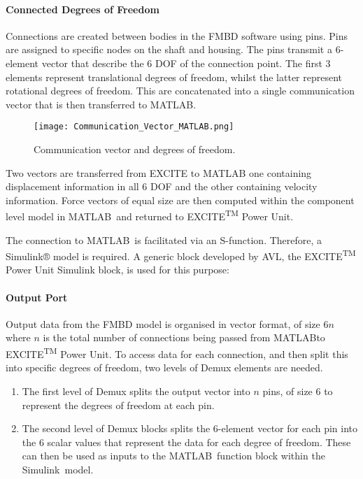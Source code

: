 \paragraph{Connected Degrees of Freedom}

Connections are created between bodies in the FMBD software using pins. Pins are assigned to specific nodes on the shaft and housing. The pins transmit a 6-element vector that describe the 6 DOF of the connection point. The first 3 elements represent translational degrees of freedom, whilst the latter represent rotational degrees of freedom. This are concatenated into a single communication vector that is then transferred to MATLAB.

\begin{figure}  
	\texttt{[image: Communication\_Vector\_MATLAB.png]}
	\caption{Communication vector and degrees of freedom.}
	\label{Communication_Vector_MATLAB}
\end{figure} 

Two vectors are transferred from EXCITE to MATLAB\textregistered\: one containing displacement information in all 6 DOF and the other containing velocity information. Force vectors of equal size are then computed within the component level model in MATLAB\textregistered\ and returned to EXCITE\textsuperscript{TM} Power Unit.

The connection to MATLAB\textregistered\ is facilitated via an S-function. Therefore, a Simulink® model is required. A generic block developed by AVL, the EXCITE\textsuperscript{TM} Power Unit Simulink block, is used for this purpose:

\paragraph{Output Port}

Output data from the FMBD model is organised in vector format, of size 6$n$ where $n$ is the total number of connections being passed from MATLAB\textregistered to EXCITE\textsuperscript{TM} Power Unit. To access data for each connection, and then split this into specific degrees of freedom, two levels of Demux elements are needed.

\begin{enumerate}
	\item The first level of Demux splits the output vector into $n$ pins, of size 6 to represent the degrees of freedom at each pin. 
	\item The second level of Demux blocks splits the 6-element vector for each pin into the 6 scalar values that represent the data for each degree of freedom. These can then be used as inputs to the MATLAB\textregistered\ function block within the Simulink\textregistered\ model.	
\end{enumerate}

